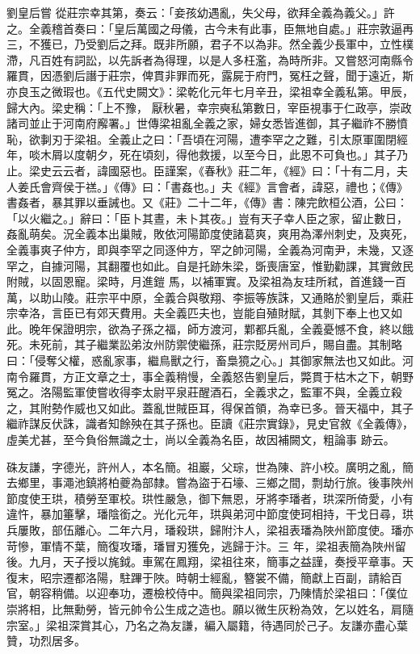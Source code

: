 \begin{pinyinscope}
 劉皇后嘗
 從莊宗幸其第，奏云：「妾孩幼遇亂，失父母，欲拜全義為義父。」許之。全義稽首奏曰：「皇后萬國之母儀，古今未有此事，臣無地自處。」莊宗敦逼再三，不獲已，乃受劉后之拜。既非所願，君子不以為非。然全義少長軍中，立性樸滯，凡百姓有詞訟，以先訴者為得理，以是人多枉濫，為時所非。又嘗怒河南縣令羅貫，因憑劉后譖于莊宗，俾貫非罪而死，露屍于府門，冤枉之聲，聞于遠近，斯亦良玉之微瑕也。《五代史闕文》：梁乾化元年七月辛丑，梁祖幸全義私第。甲辰，歸大內。梁史稱：「上不豫，
 厭秋暑，幸宗奭私第數日，宰臣視事于仁政亭，崇政諸司並止于河南府廨署。」世傳梁祖亂全義之家，婦女悉皆進御，其子繼祚不勝憤恥，欲剚刃于梁祖。全義止之曰：「吾頃在河陽，遭李罕之之難，引太原軍圍閉經年，啖木屑以度朝夕，死在頃刻，得他救援，以至今日，此恩不可負也。」其子乃止。梁史云云者，諱國惡也。臣謹案，《春秋》莊二年，《經》曰：「十有二月，夫人姜氏會齊侯于禚。」《傳》曰：「書姦也。」夫《經》言會者，諱惡，禮也；《傳》書姦者，暴其罪以垂誡也。又《莊》二十二年，《傳》書：陳完飲桓公酒，公曰：「以火繼之。」辭曰：「臣卜其晝，未卜其夜。」豈有天子幸人臣之家，留止數日，姦亂萌矣。況全義本出巢賊，敗依河陽節度使諸葛爽，爽用為澤州刺史，及爽死，全義事爽子仲方，即與李罕之同逐仲方，罕之帥河陽，全義為河南尹，未幾，又逐罕之，自據河陽，其翻覆也如此。自是托跡朱梁，斲喪唐室，惟勤勸課，其實斂民附賊，以固恩寵。梁時，月進鎧
 馬，以補軍實。及梁祖為友珪所弒，首進錢一百萬，以助山陵。莊宗平中原，全義合與敬翔、李振等族誅，又通賂於劉皇后，乘莊宗幸洛，言臣已有郊天費用。夫全義匹夫也，豈能自殖財賦，其剝下奉上也又如此。晚年保證明宗，欲為子孫之福，師方渡河，鄴都兵亂，全義憂憾不食，終以餓死。未死前，其子繼業訟弟汝州防禦使繼孫，莊宗貶房州司戶，賜自盡。其制略曰：「侵奪父權，惑亂家事，繼鳥獸之行，畜梟獍之心。」其御家無法也又如此。河南令羅貫，方正文章之士，事全義稍慢，全義怒告劉皇后，斃貫于枯木之下，朝野冤之。洛陽監軍使嘗收得李太尉平泉莊醒酒石，全義求之，監軍不與，全義立殺之，其附勢作威也又如此。蓋亂世賊臣耳，得保首領，為幸已多。晉天福中，其子繼祚謀反伏誅，識者知餘殃在其子孫也。臣讀《莊宗實錄》，見史官敘《全義傳》，虛美尤甚，至今負俗無識之士，尚以全義為名臣，故因補闕文，粗論事
 跡云。



 硃友謙，字德光，許州人，本名簡。祖巖，父琮，世為陳、許小校。廣明之亂，簡去鄉里，事澠池鎮將柏夔為部隸。嘗為盜于石壕、三鄉之間，剽劫行旅。後事陜州節度使王珙，積勞至軍校。珙性嚴急，御下無恩，牙將李璠者，珙深所倚愛，小有違忤，暴加箠擊，璠陰銜之。光化元年，珙與弟河中節度使珂相持，干戈日尋，珙兵屢敗，部伍離心。二年六月，璠殺珙，歸附汴人，梁祖表璠為陜州節度使。璠亦苛慘，軍情不葉，簡復攻璠，璠冒刃獲免，逃歸于汴。三
 年，梁祖表簡為陜州留後。九月，天子授以旄鉞。車駕在鳳翔，梁祖往來，簡事之益謹，奏授平章事。天復末，昭宗遷都洛陽，駐蹕于陜。時朝士經亂，簪裳不備，簡獻上百副，請給百官，朝容稍備。以迎奉功，遷檢校侍中。簡與梁祖同宗，乃陳情於梁祖曰：「僕位崇將相，比無勳勞，皆元帥令公生成之造也。願以微生灰粉為效，乞以姓名，肩隨宗室。」梁祖深賞其心，乃名之為友謙，編入屬籍，待遇同於己子。友謙亦盡心葉贊，功烈居多。




\end{pinyinscope}
